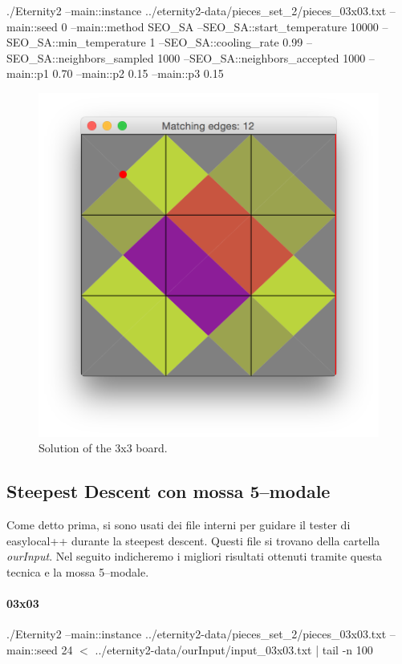 	./Eternity2 --main::instance ../eternity2-data/pieces\_set\_2/pieces\_03x03.txt --main::seed 0 --main::method SEO\_SA --SEO\_SA::start\_temperature 10000 --SEO\_SA::min\_temperature 1 --SEO\_SA::cooling\_rate 0.99 --SEO\_SA::neighbors\_sampled 1000 --SEO\_SA::neighbors\_accepted 1000 --main::p1 0.70  --main::p2 0.15  --main::p3 0.15
	
	\begin{figure}[H]
	\centering
	\includegraphics[scale=0.25]{img/sol_03x03_SA}
	\caption{Solution of the 3x3 board.}
	\end{figure}





	\subsection{Steepest Descent con mossa 5--modale}
	Come detto prima, si sono usati dei file interni per guidare il tester di easylocal++ durante la steepest descent. Questi file si trovano della cartella \emph{ourInput}. Nel seguito indicheremo i migliori risultati ottenuti tramite questa tecnica e la mossa 5--modale.

	\paragraph{03x03}
	./Eternity2 --main::instance ../eternity2-data/pieces\_set\_2/pieces\_03x03.txt --main::seed 24 $<$ ../eternity2-data/ourInput/input\_03x03.txt | tail -n 100

